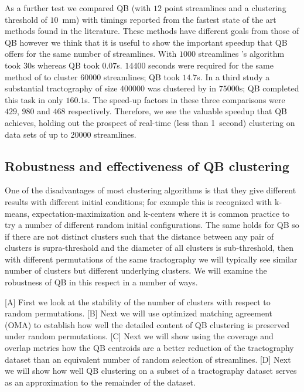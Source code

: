 \documentclass{bioinfo}
\begin{document}
As a further test we compared QB (with $12$ point streamlines and a
clustering threshold of $10$~mm) with timings reported from the fastest
state of the art methods found in the literature. These methods have
different goals from those of QB however we think that it is useful to
show the important speedup that QB offers for the same number of
streamlines. With $\num{1000}$ streamlines
\citet{wang2010tractography}'s algorithm took $30$s whereas QB took
$0.07$s.  $\num{14400}$ seconds were required for the same method of to
cluster $\num{60000}$ streamlines; QB took $14.7$s.  In a third study a
substantial tractography of size $\num{400000}$ was clustered by
\citet{Visser2010} in $\num{75000}$s; QB completed this task in only
$160.1$s. The speed-up factors in these three comparisons were $429$,
$980$ and $468$ respectively. Therefore, we see the valuable speedup
that QB achieves, holding out the prospect of real-time (less than
1~second) clustering on data sets of up to \num{20000} streamlines.

\subsection{Robustness and effectiveness of QB  clustering\label{sub:Comparisons}}


One of the disadvantages of most clustering algorithms is that they give
different results with different initial conditions; for example this is
recognized with k-means, expectation-maximization
\citep{dempster1977maximum} and k-centers \citep{gonzalez1985clustering}
where it is common practice to try a number of different random initial
configurations. The same holds for QB so if there are not distinct
clusters such that the distance between any pair of clusters is
supra-threshold and the diameter of all clusters is sub-threshold, then
with different permutations of the same tractography we will typically
see similar number of clusters but different underlying clusters. We
will examine the robustness of QB in this respect in a number of ways.

[A] First we look at the stability of the number of clusters with
respect to random permutations. [B] Next we will use optimized matching
agreement (OMA) to establish how well the detailed content of QB
clustering is preserved under random permutations. [C] Next we will show
using the coverage and overlap metrics how the QB centroids are a better
reduction of the tractography dataset than an equivalent number of
random selection of streamlines. [D] Next we will show how well QB
clustering on a subset of a tractography dataset serves as an
approximation to the remainder of the dataset.
\end{document}
